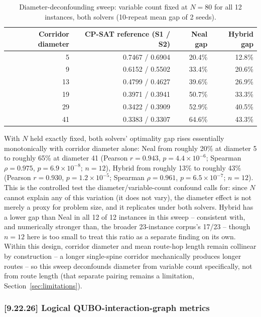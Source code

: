 \documentclass[11pt]{article}
\begin{document}
\begin{table}[h]
\centering
\caption{Diameter-deconfounding sweep: variable count fixed at $N=80$ for all 12 instances, both solvers (10-repeat mean gap of 2 seeds).}
\label{tab:dsweep}
\small
\begin{tabular}{rrrr}
\toprule
Corridor diameter & CP-SAT reference (S1 / S2) & Neal gap & Hybrid gap \\
\midrule
5  & 0.7467 / 0.6904 & 20.4\% & 12.8\% \\
9  & 0.6152 / 0.5502 & 33.4\% & 20.6\% \\
13 & 0.4799 / 0.4627 & 39.6\% & 26.9\% \\
19 & 0.3971 / 0.3941 & 50.7\% & 33.3\% \\
29 & 0.3422 / 0.3909 & 52.9\% & 40.5\% \\
41 & 0.3383 / 0.3307 & 64.6\% & 43.3\% \\
\bottomrule
\end{tabular}
\end{table}

With $N$ held exactly fixed, both solvers' optimality gap rises essentially monotonically with corridor diameter alone: Neal from roughly 20\% at diameter 5 to roughly 65\% at diameter 41 (Pearson $r=0.943$, $p=4.4\times10^{-6}$; Spearman $\rho=0.975$, $p=6.9\times10^{-8}$; $n=12$), Hybrid from roughly 13\% to roughly 43\% (Pearson $r=0.930$, $p=1.2\times10^{-5}$; Spearman $\rho=0.961$, $p=6.5\times10^{-7}$; $n=12$). This is the controlled test the diameter/variable-count confound calls for: since $N$ cannot explain any of this variation (it does not vary), the diameter effect is not merely a proxy for problem size, and it replicates under both solvers. Hybrid has a lower gap than Neal in all 12 of 12 instances in this sweep -- consistent with, and numerically stronger than, the broader 23-instance corpus's 17/23 -- though $n=12$ here is too small to treat this ratio as a separate finding on its own. Within this design, corridor diameter and mean route-hop length remain collinear by construction -- a longer single-spine corridor mechanically produces longer routes -- so this sweep deconfounds diameter from variable count specifically, not from route length (that separate pairing remains a limitation, Section~\ref{sec:limitations}).

\subsubsection{[9.22.26] Logical QUBO-interaction-graph metrics}
\label{sec:qubograph}
\end{document}
